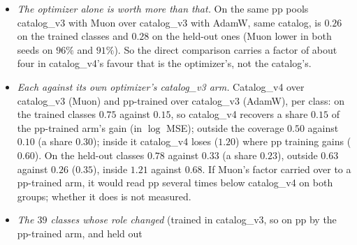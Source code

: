 \documentclass[11pt]{article}
\begin{document}
\begin{itemize}
    on pp ($0.86$ against $0.47$) and level with it on the held-out ones ($0.94$ against $0.92$).
  \item \emph{The optimizer alone is worth more than that.} On the same pp pools catalog\_v3 with Muon over catalog\_v3
    with AdamW, same catalog, is $0.26$ on the trained classes and $0.28$ on the held-out ones (Muon lower in both
    seeds on $96\%$ and $91\%$). So the direct comparison carries a factor of about four in catalog\_v4's favour that
    is the optimizer's, not the catalog's.
  \item \emph{Each against its own optimizer's catalog\_v3 arm.} Catalog\_v4 over catalog\_v3 (Muon) and pp-trained
    over catalog\_v3 (AdamW), per class: on the trained classes $0.75$ against $0.15$, so catalog\_v4 recovers a share
    $0.15$ of the pp-trained arm's gain (in $\log$ MSE); outside the coverage $0.50$ against $0.10$ (a share $0.30$);
    inside it catalog\_v4 loses ($1.20$) where pp training gains ($0.60$). On the held-out classes $0.78$ against $0.33$
    (a share $0.23$), outside $0.63$ against $0.26$ ($0.35$), inside $1.21$ against $0.68$. If Muon's factor carried
    over to a pp-trained arm, it would read pp several times below catalog\_v4 on both groups; whether it does is not
    measured.
  \item \emph{The $39$ classes whose role changed} (trained in catalog\_v3, so on pp by the pp-trained arm, and held out

\end{itemize}
\end{document}
